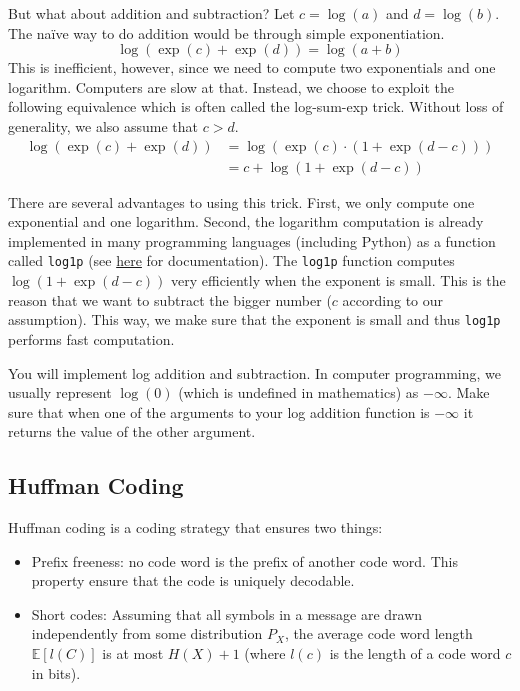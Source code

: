 \documentclass[11pt, leqno, a4paper]{article}
\begin{document}
But what about addition and subtraction? Let $ c = \log(a) $ and $ d = \log(b) $. The na\"ive way to do addition would be through simple exponentiation.
\begin{equation*}
\log(\exp(c) + \exp(d)) = \log(a + b)
\end{equation*}
This is inefficient, however, since we need to compute two exponentials and one logarithm. Computers are slow at that. Instead, we choose to exploit the
following equivalence which is often called the log-sum-exp trick. Without loss of generality, we also assume that $ c > d $.
\begin{align*}
\log(\exp(c) + \exp(d)) &= \log(\exp(c) \cdot (1 + \exp(d-c)))  \\
&= c + \log(1 + \exp(d-c)) 
\end{align*}

There are several advantages to using this trick. First, we only compute one exponential and one logarithm. Second, the logarithm computation is already 
implemented in many programming languages (including Python) as a function called \texttt{log1p} (see \href{https://docs.python.org/3/library/math.html}{here} for documentation). The \texttt{log1p} function computes $ \log(1 + \exp(d-c)) $ very efficiently when the exponent is small. This is the reason that we want to subtract
the bigger number ($ c $ according to our assumption). This way, we make sure that the exponent is small and thus \texttt{log1p} performs fast computation.

You will implement log addition and subtraction. In computer programming, we usually represent $ \log(0) $ (which is undefined in mathematics) as 
$ -\infty $. Make sure that when one of the arguments to your log addition function is $ -\infty $ it returns the value of the other argument.

\subsection{Huffman Coding}

Huffman coding is a coding strategy that ensures two things:
\begin{itemize}
\item Prefix freeness: no code word is the prefix of another code word. This property ensure that the code is uniquely decodable.
\item Short codes: Assuming that all symbols in a message are drawn independently from some distribution $ P_{X} $, the average code word
length $ \mathbb{E}\left[l(C)\right] $ is at most $ H(X) + 1 $ (where $ l(c) $ is the length of a code word $ c $ in bits).
\end{itemize}
\end{document}
